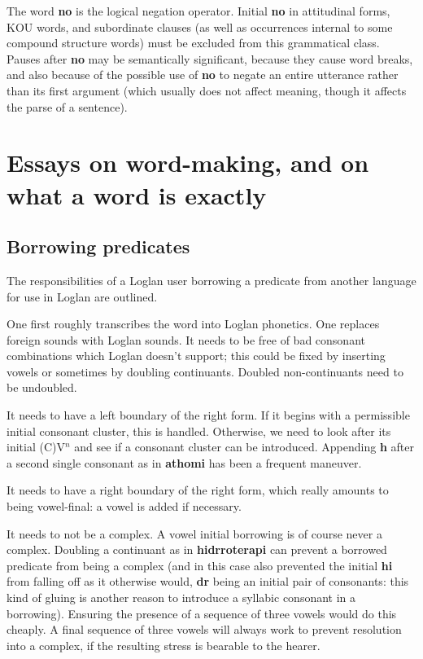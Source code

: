 \documentclass[12pt]{book}
\begin{document}
{The word {\bf no} is the logical negation operator.   Initial {\bf no} in attitudinal forms, KOU words, and subordinate clauses (as well as occurrences internal to some compound structure words) must be excluded from this grammatical class.  Pauses after {\bf no} may be semantically significant, because they cause word breaks, and also because of the possible use of {\bf no} to negate an entire utterance rather than its first argument (which usually does not affect meaning, though it affects the parse of a sentence).

\section{Essays on word-making, and on what a word is exactly}

\subsection{Borrowing predicates}

The responsibilities of a Loglan user borrowing a predicate from another language for use in Loglan are outlined.

One first roughly transcribes the word into Loglan phonetics.  One replaces foreign sounds with Loglan sounds.
It needs to be free of bad consonant combinations which Loglan doesn't support; this could be fixed by inserting vowels or sometimes by doubling continuants.   Doubled non-continuants need to be undoubled.

It needs to have a left boundary of the right form.  If it begins with a permissible initial consonant cluster, this is handled.  Otherwise, we need to look after its initial (C)V$^n$ and see if
a consonant cluster can be introduced.  Appending {\bf h} after a  second single consonant as in {\bf athomi} has been a frequent maneuver.

It needs to have a right boundary of the right form, which really amounts to being vowel-final:  a vowel is added if necessary.

It needs to not be a complex.  A vowel initial borrowing is of course never a complex.  Doubling a continuant as in {\bf hidrroterapi} can prevent a borrowed predicate from being a complex (and in this case also prevented the initial {\bf hi} from falling off as it otherwise would, {\bf dr} being an initial pair of consonants:  this kind of gluing is another reason to introduce a syllabic consonant in a borrowing).  Ensuring the presence of a sequence of three vowels would  do this cheaply.  A final sequence of three vowels will always work to prevent resolution into a complex, if the resulting stress is bearable to the hearer.

}
\end{document}
